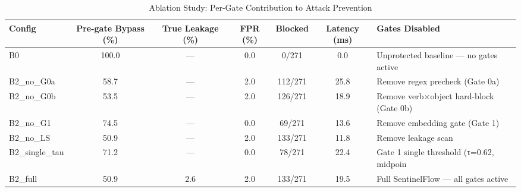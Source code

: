 \begin{table}[htbp]
\centering
\caption{Ablation Study: Per-Gate Contribution to Attack Prevention}
\label{tab:ablation}
\begin{tabular}{lcccccl}
\toprule
\textbf{Config} & \textbf{Pre-gate Bypass (\%)} & \textbf{True Leakage (\%)} & \textbf{FPR (\%)} & \textbf{Blocked} & \textbf{Latency (ms)} & \textbf{Gates Disabled} \\
\midrule
  B0 & 100.0 & --- & 0.0 & 0/271 & 0.0 & Unprotected baseline — no gates active \\
  B2\_no\_G0a & 58.7 & --- & 2.0 & 112/271 & 25.8 & Remove regex precheck (Gate 0a) \\
  B2\_no\_G0b & 53.5 & --- & 2.0 & 126/271 & 18.9 & Remove verb×object hard-block (Gate 0b) \\
  B2\_no\_G1 & 74.5 & --- & 0.0 & 69/271 & 13.6 & Remove embedding gate (Gate 1) \\
  B2\_no\_LS & 50.9 & --- & 2.0 & 133/271 & 11.8 & Remove leakage scan \\
  B2\_single\_tau & 71.2 & --- & 0.0 & 78/271 & 22.4 & Gate 1 single threshold (τ=0.62, midpoin \\
  B2\_full & 50.9 & 2.6 & 2.0 & 133/271 & 19.5 & Full SentinelFlow — all gates active \\
\bottomrule
\end{tabular}
\end{table}
